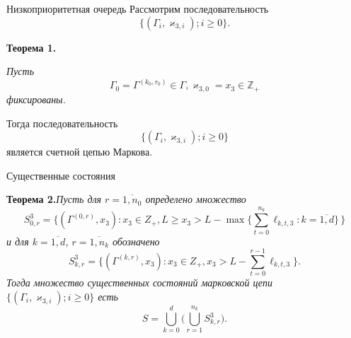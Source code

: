\documentclass[10pt]{beamer}
\begin{document}
\begin{frame}{Низкоприоритетная очередь}
Рассмотрим последовательность
 $$\{(\Gamma_i, \varkappa_{3,i}); i \geqslant 0\}.$$
 
\begin{block}
    {\bf Теорема 1.} {\it 
    Пусть $$\Gamma_0=\Gamma^{(k_0,r_0)} \in \Gamma,  \varkappa_{3,0}=x_3\in \mathbb{Z}_+$$ фиксированы. 
    
    Тогда последовательность $$\{(\Gamma_i, \varkappa_{3,i}); i \geqslant 0\}$$ является счетной цепью Маркова.}
\end{block}
\end{frame}

\begin{frame}{Существенные состояния}

\begin{block}
    {\bf Теорема 2.}{\it Пусть для $r=\overline{1,n_0}$ определено множество \begin{equation}
    S^3_{0,r} =\bigl\{(\Gamma^{(0,r)},x_3)  \colon x_3\in Z_+,  L \geqslant x_3 > L - \max\bigl\{\sum_{t=0}^{n_k} \ell_{k,t,3}\colon k=\overline{1,d}\bigr\}\,\bigr\}
    \end{equation}
    и для $k=\overline{1,d}$, $r=\overline{1,n_k}$ обозначено 
    \begin{equation}
    S^3_{k,r} =  \{(\Gamma^{(k,r)},x_3) \colon x_3\in Z_+, x_3 > L - \sum_{t=0}^{r-1} \ell_{k,t,3}\}.
    \end{equation}
    Тогда множество существенных состояний марковской цепи $\{(\Gamma_i, \varkappa_{3,i}); i \geqslant 0\}$ есть 
    \begin{equation}
    S=\bigcup_{k=0}^d \bigl(\bigcup_{r=1}^{n_k} S^3_{k,r}\bigr).
    \end{equation}
    }
\end{block}
\end{frame}
\end{document}
